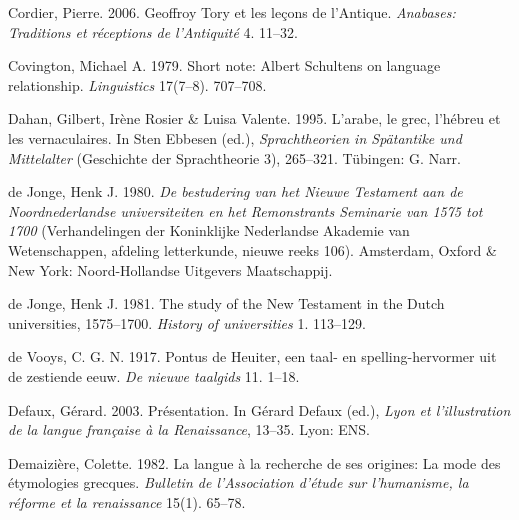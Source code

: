 \begin{styleStandard}
Cordier, Pierre. 2006. Geoffroy Tory et les leçons de l’Antique. \textit{Anabases: Traditions et réceptions de l’Antiquité} 4. 11–32.
\end{styleStandard}

\begin{styleStandard}
Covington, Michael A. 1979. Short note: Albert Schultens on language relationship. \textit{Linguistics} 17(7–8). 707–708.
\end{styleStandard}

\begin{styleStandard}
Dahan, Gilbert, Irène Rosier \& Luisa Valente. 1995. L’arabe, le grec, l’hébreu et les vernaculaires. In Sten Ebbesen (ed.), \textit{Sprachtheorien in Spätantike und Mittelalter} (Geschichte der Sprachtheorie 3), 265–321. Tübingen: G. Narr.
\end{styleStandard}

\begin{styleStandard}
de Jonge, Henk J. 1980. \textit{De bestudering van het Nieuwe Testament aan de Noordnederlandse universiteiten en het Remonstrants Seminarie van 1575 tot 1700} (Verhandelingen der Koninklijke Nederlandse Akademie van Wetenschappen, afdeling letterkunde, nieuwe reeks 106). Amsterdam, Oxford \& New York: Noord-Hollandse Uitgevers Maatschappij.
\end{styleStandard}

\begin{styleStandard}
de Jonge, Henk J. 1981. The study of the New Testament in the Dutch universities, 1575–1700. \textit{History of universities} 1. 113–129.
\end{styleStandard}

\begin{styleStandard}
de Vooys, C. G. N. 1917. Pontus de Heuiter, een taal- en spelling-hervormer uit de zestiende eeuw. \textit{De nieuwe taalgids} 11. 1–18.
\end{styleStandard}

\begin{styleStandard}
Defaux, Gérard. 2003. Présentation. In Gérard Defaux (ed.), \textit{Lyon et l’illustration de la langue française à la Renaissance}, 13–35. Lyon: ENS.
\end{styleStandard}

\begin{styleStandard}
Demaizière, Colette. 1982. La langue à la recherche de ses origines: La mode des étymologies grecques. \textit{Bulletin de l’Association d’étude sur l’humanisme, la réforme et la renaissance} 15(1). 65–78.
\end{styleStandard}

